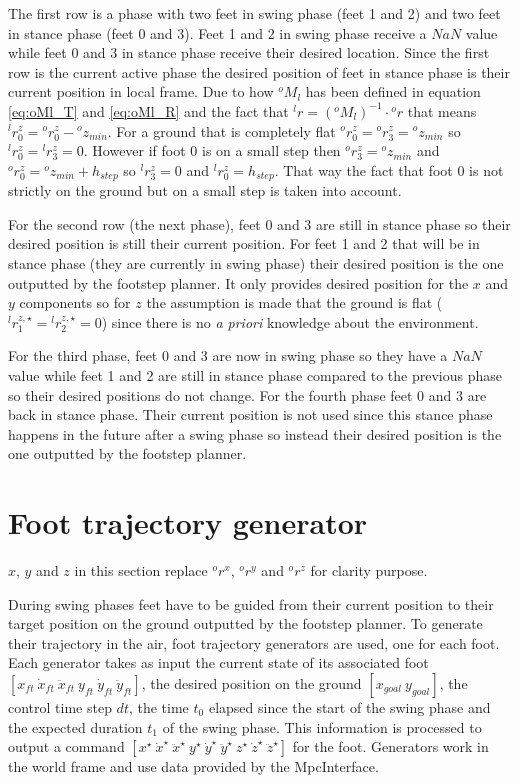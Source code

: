 \documentclass[a4paper,11pt]{article}
\newcommand{\fM}[2]{{}^{#1}\!M_{#2}}
\begin{document}
The first row is a phase with two feet in swing phase (feet 1 and 2) and two feet in stance phase (feet 0 and 3). Feet 1 and 2 in swing phase receive a $\mathit{NaN}$ value while feet 0 and 3 in stance phase receive their desired location. Since the first row is the current active phase the desired position of feet in stance phase is their current position in local frame. Due to how $\fM{o}{l}$ has been defined in equation \ref{eq:oMl_T} and \ref{eq:oMl_R} and the fact that ${}^l\!r = (\fM{o}{l})^{-1} \cdot {}^o\!r$ that means ${}^l\!r_0^z = {}^o\!r_0^z - {}^o\!z_{min}$. For a ground that is completely flat ${}^o\!r_0^z = {}^o\!r_3^z = {}^o\!z_{min}$ so ${}^l\!r_0^z  = {}^l\!r_3^z  = 0$. However if foot 0 is on a small step then ${}^o\!r_3^z = {}^o\!z_{min}$ and ${}^o\!r_0^z = {}^o\!z_{min} + h_{step}$ so ${}^l\!r_3^z  = 0$ and ${}^l\!r_0^z = h_{step}$. That way the fact that foot 0 is not strictly on the ground but on a small step is taken into account.

For the second row (the next phase), feet 0 and 3 are still in stance phase so their desired position is still their current position. For feet 1 and 2 that will be in stance phase (they are currently in swing phase) their desired position is the one outputted by the footstep planner. It only provides desired position for the $x$ and $y$ components so for $z$ the assumption is made that the ground is flat (${}^l\!r_1^{z,\star} = {}^l\!r_2^{z,\star} = 0$) since there is no \textit{a priori} knowledge about the environment.

For the third phase, feet 0 and 3 are now in swing phase so they have a $\mathit{NaN}$ value while feet 1 and 2 are still in stance phase compared to the previous phase so their desired positions do not change. For the fourth phase feet 0 and 3 are back in stance phase. Their current position is not used since this stance phase happens in the future after a swing phase so instead their desired position is the one outputted by the footstep planner.

\section{Foot trajectory generator}

$x$, $y$ and $z$ in this section replace ${}^o\!r^x$, ${}^o\!r^y$ and ${}^o\!r^z$ for clarity purpose.

During swing phases feet have to be guided from their current position to their target position on the ground outputted by the footstep planner. To generate their trajectory in the air, foot trajectory generators are used, one for each foot. Each generator takes as input the current state of its associated foot $[x_{ft} ~ \dot x_{ft} ~ \ddot x_{ft} ~ y_{ft} ~ \dot y_{ft} ~ \ddot y_{ft}]$, the desired position on the ground $[x_{goal} ~ y_{goal}]$, the control time step $dt$, the time $t_0$ elapsed since the start of the swing phase and the expected duration $t_1$ of the swing phase. This information is processed to output a command $[x^\star ~ \dot x^\star ~ \ddot x^\star ~ y^\star ~ \dot y^\star ~ \ddot y^\star ~ z^\star ~ \dot z^\star ~ \ddot z^\star]$ for the foot. Generators work in the world frame and use data provided by the MpcInterface.
\end{document}
